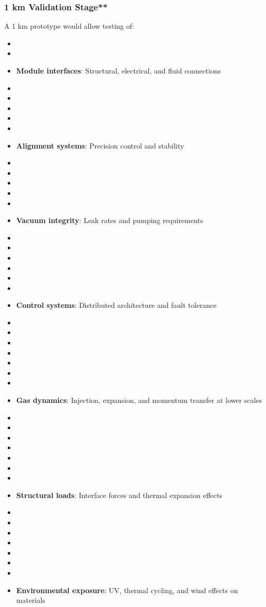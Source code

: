\subsubsection{1 km Validation Stage**}
A 1 km prototype would allow testing of:
\begin{itemize}
    \item \item \item \textbf{Module interfaces}: Structural, electrical, and fluid connections
    \item \item \item \item \item \item \textbf{Alignment systems}: Precision control and stability
    \item \item \item \item \item \item \textbf{Vacuum integrity}: Leak rates and pumping requirements
    \item \item \item \item \item \item \item \textbf{Control systems}: Distributed architecture and fault tolerance
    \item \item \item \item \item \item \item \item \textbf{Gas dynamics}: Injection, expansion, and momentum transfer at lower scales
    \item \item \item \item \item \item \item \item \textbf{Structural loads}: Interface forces and thermal expansion effects
    \item \item \item \item \item \item \item \item \textbf{Environmental exposure}: UV, thermal cycling, and wind effects on materials
\end{itemize}
